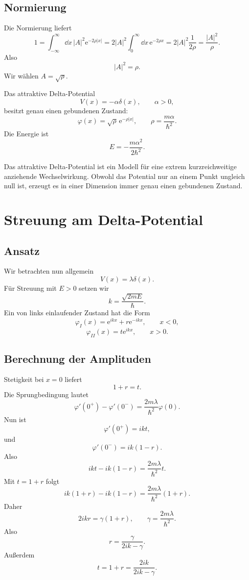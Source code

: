 \subsection{Normierung}

Die Normierung liefert
\[
    1=\int_{-\infty}^{\infty}\dd x\,|A|^2\mathrm{e}^{-2\rho|x|}
    =2|A|^2\int_0^\infty\dd x\,\mathrm{e}^{-2\rho x}
    =2|A|^2\frac{1}{2\rho}
    =\frac{|A|^2}{\rho}.
\]
Also
\[
    |A|^2=\rho.
\]
Wir wählen $A=\sqrt{\rho}$.

\begin{formulabox}
Das attraktive Delta-Potential
\[
    V(x)=-\alpha\delta(x),
    \qquad \alpha>0,
\]
besitzt genau einen gebundenen Zustand:
\[
    \varphi(x)=\sqrt{\rho}\,\mathrm{e}^{-\rho|x|},
    \qquad
    \rho=\frac{m\alpha}{\hbar^2}.
\]
Die Energie ist
\[
    E=-\frac{m\alpha^2}{2\hbar^2}.
\]
\end{formulabox}

\begin{conceptbox}
Das attraktive Delta-Potential ist ein Modell für eine extrem kurzreichweitige anziehende Wechselwirkung. Obwohl das Potential nur an einem Punkt ungleich null ist, erzeugt es in einer Dimension immer genau einen gebundenen Zustand.
\end{conceptbox}

\section{Streuung am Delta-Potential}

\subsection{Ansatz}

Wir betrachten nun allgemein
\[
    V(x)=\lambda\delta(x).
\]
Für Streuung mit $E>0$ setzen wir
\[
    k=\frac{\sqrt{2mE}}{\hbar}.
\]
Ein von links einlaufender Zustand hat die Form
\[
    \varphi_I(x)=\mathrm{e}^{ikx}+r\mathrm{e}^{-ikx},
    \qquad x<0,
\]
\[
    \varphi_{II}(x)=t\mathrm{e}^{ikx},
    \qquad x>0.
\]

\subsection{Berechnung der Amplituden}

Stetigkeit bei $x=0$ liefert
\[
    1+r=t.
\]
Die Sprungbedingung lautet
\[
    \varphi'(0^+)-\varphi'(0^-)=\frac{2m\lambda}{\hbar^2}\varphi(0).
\]
Nun ist
\[
    \varphi'(0^+)=ikt,
\]
und
\[
    \varphi'(0^-)=ik(1-r).
\]
Also
\[
    ikt-ik(1-r)=\frac{2m\lambda}{\hbar^2}t.
\]
Mit $t=1+r$ folgt
\[
    ik(1+r)-ik(1-r)=\frac{2m\lambda}{\hbar^2}(1+r).
\]
Daher
\[
    2ikr=\gamma(1+r),
    \qquad
    \gamma=\frac{2m\lambda}{\hbar^2}.
\]
Also
\[
    r=\frac{\gamma}{2ik-\gamma}.
\]
Außerdem
\[
    t=1+r=\frac{2ik}{2ik-\gamma}.
\]

